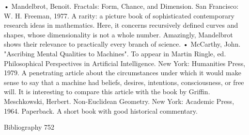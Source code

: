 • Mandelbrot, Benoit. Fractals: Form, Chance, and Dimension. San Francisco: W. H.
  Freeman, 1977. A rarity: a picture book of sophisticated contemporary research ideas in
  mathematics. Here, it concerns recursively defined curves and shapes, whose
  dimensionality is not a whole number. Amazingly, Mandelbrot shows their relevance to
  practically every branch of science.
• McCarthy, John. "Ascribing Mental Qualities to Machines". To appear in Martin
  Ringle, ed. Philosophical Perspectives in Artificial Intelligence. New York: Humanities
  Press, 1979. A penetrating article about the circumstances under which it would make
  sense to say that a machine had beliefs, desires, intentions, consciousness, or free will.
  It is interesting to compare this article with the book by Griffin.
Meschkowski, Herbert. Non-Euclidean Geometry. New York: Academic Press, 1964.
  Paperback. A short book with good historical commentary.



Bibliography                                                                            752

